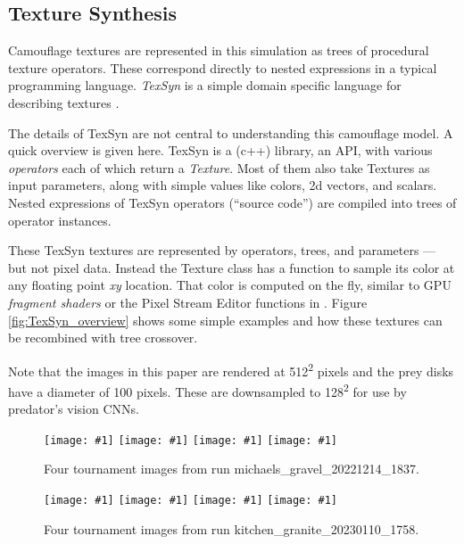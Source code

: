 \documentclass[letterpaper]{article}
\newcommand{\jargon}[1]{\textit{#1}}
\newcommand{\texsyn}[0]{TexSyn}
\newcommand{\runID}{\footnotesize}
\newcommand{\igfour}[1]{\texttt{[image: \#1]}}
\begin{document}
\subsection{Texture Synthesis}
\label{subsec:texture_synthesis}
Camouflage textures are represented in this simulation as trees of procedural texture operators. These correspond directly to nested expressions in a typical programming language. \jargon{\texsyn{}} is a simple domain specific language for describing textures \citep{reynolds_texsyn_2019}.
\par
The details of \texsyn{} are not central to understanding this camouflage model. A quick overview is given here. \texsyn{} is a (c++) library, an API, with various \jargon{operators} each of which return a \jargon{Texture}. Most of them also take Textures as input parameters, along with simple values like colors, 2d vectors, and scalars. Nested expressions of \texsyn{} operators (“source code”) are compiled into trees of operator instances.
\par
These \texsyn{} textures are represented by operators, trees, and parameters --- but not pixel data. Instead the Texture class has a function to sample its color at any floating point \textit{xy} location. That color is computed on the fly, similar to GPU \jargon{fragment shaders} or the Pixel Stream Editor functions in \citet{perlin_image_1985}. Figure \ref{fig:TexSyn_overview} shows some simple examples and how these textures can be recombined with tree crossover.
\par
Note that the images in this paper are rendered at 512\textsuperscript{2} pixels and the prey disks have a diameter of 100 pixels. These are downsampled to 128\textsuperscript{2} for use by predator's vision CNNs. 
\par

\begin{figure}[t]
    \igfour{20221215_step_5867.png}
    \hfill
    \igfour{20221215_step_5892.png}
    \hfill
    \igfour{20221215_step_6830.png}
    \hfill
    \igfour{20221215_step_6916.png}
    \caption{Four tournament images from run {\runID michaels\_gravel\_20221214\_1837}.}
    \label{fig:michaels_gravel_4x}
\end{figure}

\begin{figure}[t]
    \igfour{20230111_step_5576.png}
    \hfill
    \igfour{20230111_step_6159.png}
    \hfill
    \igfour{20230111_step_6303.png}
    \hfill
    \igfour{20230111_step_6726.png}
    \caption{Four tournament images from run {\runID kitchen\_granite\_20230110\_1758}.}
    \label{fig:kitchen_granite_4x}
\end{figure}
\end{document}
